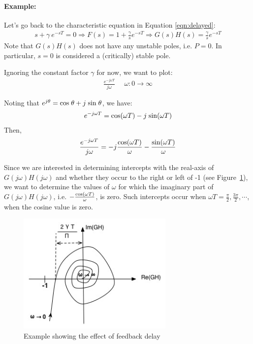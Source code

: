 \documentclass{article}
\def\sn{{\rm sin}}
\def\cs{{\rm cos}}
\begin{document}
\paragraph{Example:}
Let's go back to the characteristic equation in Equation \ref{eqn:delayed}:
\begin{eqnarray*}
s + \gamma\ e^{-sT} = 0  \Rightarrow F(s) = 1 + \frac{\gamma}{s} e^{-sT} \Rightarrow G(s)H(s) = \frac{\gamma}{s} e^{-sT}
\end{eqnarray*}
Note that $G(s)H(s)$ does not have any unstable poles, i.e. $P=0$. 
In particular, $s=0$ is considered a (critically) stable pole.

Ignoring the constant factor $\gamma$ for now, we want to plot:
\begin{eqnarray*}
\frac{e^{-j \omega T}}{j \omega} \ \ \ \ \ \  \omega: 0 \rightarrow \infty
\end{eqnarray*}

Noting that $e^{j \theta} = \cs \; \theta + j\; \sn \; \theta$, we have:
\begin{eqnarray*}
e^{-j \omega T} = \cs(\omega T) - j\; \sn(\omega T) 
\end{eqnarray*}
Then,
\begin{eqnarray*}
\frac{e^{-j \omega T}}{j \omega} = - j \frac{\cs(\omega T)}{\omega} - \frac{\sn(\omega T)}{\omega} 
\end{eqnarray*}

Since we are interested in determining intercepts with the real-axis of $G(j \omega) H(j \omega)$
and whether they occur to the right or left of -1 (see Figure~\ref{fig:ex-nyquist}),
we want to determine the values of $\omega$ 
for which the imaginary part of $G(j \omega) H(j \omega)$, i.e. $- \frac{\cs(\omega T)}{\omega}$, is zero.
Such intercepts occur when $\omega T = \frac{\pi}{2}, \frac{3 \pi}{2}, \cdots$, when the cosine value is zero.

\begin{figure}[htbp] %
   \centering
   \includegraphics[width=3in]{figures/ex-nyquist.jpg} 
   \caption{Example showing the effect of feedback delay}
   \label{fig:ex-nyquist}
\end{figure}
\end{document}
